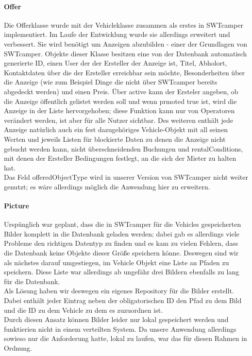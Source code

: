 \paragraph{Offer}
Die Offerklasse wurde mit der Vehicleklasse zusammen als erstes in SWTcamper implementiert. Im Laufe der Entwicklung wurde sie allerdings erweitert und verbessert. Sie wird benötigt um Anzeigen abzubilden - einer der Grundlagen von SWTcamper. Objekte dieser Klasse besitzen eine von der Datenbank automatisch generierte ID, einen User der der Ersteller der Anzeige ist, Titel, Abholort, Kontaktdaten über die der Ersteller erreichbar sein möchte, Besonderheiten über die Anzeige (wie zum Beispiel Dinge die nicht über SWTcamper bereits abgedeckt werden) und einen Preis. Über active kann der Ersteler angeben, ob die Anzeige öffentlich gelistet werden soll und wenn prmoted true ist, wird die Anzeige in der Liste hervorgehoben; diese Funktion kann nur von Operatoren verändert werden, ist aber für alle Nutzer sichtbar. Des weiteren enthält jede Anzeige natürlich auch ein fest dazugehöriges Vehicle-Objekt mit all seinen Werten und jeweils Listen für blockierte Daten zu denen die Anzeige nicht gebucht werden kann, nicht überschneidenden Buchungen und rentalConditions, mit denen der Ersteller Bedingungen festlegt, an die sich der Mieter zu halten hat. \\
Das Feld offeredObjectType wird in unserer Version von SWTcamper nicht weiter genutzt; es wäre allerdings möglich die Anwendung hier zu erweitern.

\paragraph{Picture}
Urspünglich war geplant, dass die in SWTcamper für die Vehicles gespeicherten Bilder komplett in die Datenbank geladen werden; dabei gab es allerdings viele Probleme den richtigen Datentyp zu finden und es kam zu vielen Fehlern, dass die Datenbank keine Objekte dieser Größe speichern könne. Deswegen sind wir als nächstes darauf umgestiegen, im Vehicle Objekt eine Liste an Pfaden zu speichern. Diese Liste war allerdings ab ungefähr drei Bildern ebenfalls zu lang für die Datenbank. \\
Als Lösung haben wir deswegen ein eigenes Repository für die Bilder erstellt. Dabei enthält jeder Eintrag neben der obligatorischen ID den Pfad zu dem Bild und die ID zu dem Vehicle zu dem es zuzuordnen ist. \\
Durch diesen Ansatz können Bilder leider nur lokal gespeichert werden und funktierien nicht in einem verteilten System. Da unsere Anwendung allerdings sowieso nur die Anforderung hatte, lokal zu laufen, war das für diesen Rahmen in Ordnung.

